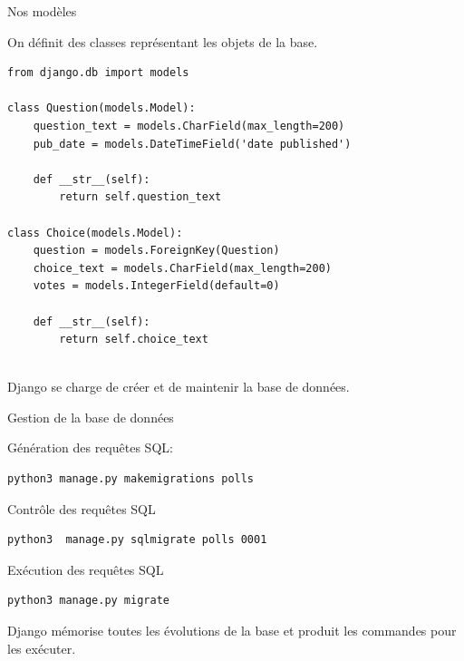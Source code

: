 \begin{frame}[fragile]{Nos modèles}

On définit des \alert{classes} représentant les objets de la base.

\begin{verbatim}
from django.db import models

class Question(models.Model):
    question_text = models.CharField(max_length=200)
    pub_date = models.DateTimeField('date published')

    def __str__(self):           
        return self.question_text

class Choice(models.Model):
    question = models.ForeignKey(Question)
    choice_text = models.CharField(max_length=200)
    votes = models.IntegerField(default=0)
    
    def __str__(self):           
        return self.choice_text
    
\end{verbatim}

Django se charge de créer et de maintenir la base de données. 
\end{frame}


\begin{frame}[fragile]{Gestion de la base de données}

Génération des requêtes SQL:

\begin{verbatim}
python3 manage.py makemigrations polls
\end{verbatim}

\vfill

Contrôle des requêtes SQL
\begin{verbatim}
python3  manage.py sqlmigrate polls 0001
\end{verbatim}

\vfill

Exécution des requêtes SQL
\begin{verbatim}
python3 manage.py migrate
\end{verbatim}

\vfill

Django mémorise toutes les évolutions de la base et produit les commandes pour
les exécuter.

\end{frame}


